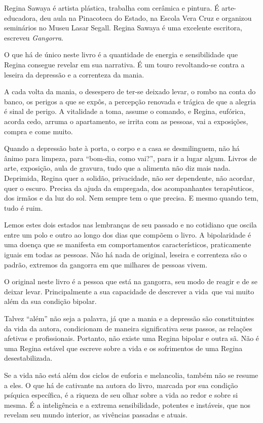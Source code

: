 Regina Sawaya é artista plástica, trabalha com cerâmica e pintura. É
arte-educadora, deu aula na Pinacoteca do Estado, na Escola Vera Cruz e
organizou seminários no Museu Lasar Segall. Regina Sawaya é uma
excelente escritora, escreveu \emph{Gangorra}.

\asterisc

O que há de único neste livro é a quantidade de energia e sensibilidade
que Regina consegue revelar em sua narrativa. É um touro revoltando-se
contra a leseira da depressão e a correnteza da mania.

A cada volta da mania, o desespero de ter-se deixado levar, o rombo na
conta do banco, os perigos a que se expôs, a percepção renovada e
trágica de que a alegria é sinal de perigo. A vitalidade a toma, assume
o comando, e Regina, eufórica, acorda cedo, arruma o apartamento, se
irrita com as pessoas, vai a exposições, compra e come muito.

Quando a depressão bate à porta, o corpo e a casa se desmilinguem, não
há ânimo para limpeza, para ``bom-dia, como vai?'', para ir a lugar
algum. Livros de arte, exposição, aula de gravura, tudo que a alimenta
não diz mais nada. Deprimida, Regina quer a solidão, privacidade, não
ser dependente, não acordar, quer o escuro. Precisa da ajuda da
empregada, dos acompanhantes terapêuticos, dos irmãos e da luz do sol.
Nem sempre tem o que precisa. E mesmo quando tem, tudo é ruim.

Lemos estes dois estados nas lembranças de seu passado e no cotidiano
que oscila entre um polo e outro ao longo dos dias que compõem o livro.
A bipolaridade é uma doença que se manifesta em comportamentos
característicos, praticamente iguais em todas as pessoas. Não há nada de
original, leseira e correnteza são o padrão, extremos da gangorra em que
milhares de pessoas vivem.

O original neste livro é a pessoa que está na gangorra, seu modo de
reagir e de se deixar levar. Principalmente a sua capacidade de
descrever a vida~que vai muito além da sua condição bipolar.

Talvez ``além'' não seja a palavra, já que a mania e a depressão são
constituintes da vida da autora, condicionam de maneira significativa
seus passos, as relações afetivas e profissionais. Portanto, não existe
uma Regina bipolar e outra sã. Não é uma Regina estável que escreve
sobre a vida e os sofrimentos de uma Regina desestabilizada.

Se a vida não está além dos ciclos de euforia e melancolia, também não
se resume a eles. O que há de cativante na autora do livro, marcada por
sua condição psíquica específica, é a riqueza de seu olhar sobre a vida
ao redor e sobre si mesma. É a inteligência e a extrema sensibilidade,
potentes e instáveis, que nos revelam seu mundo interior, as vivências
passadas e atuais.

